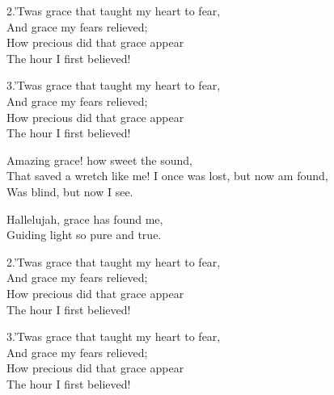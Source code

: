 \documentclass[12pt]{article}
\begin{document}
\begin{stanza}
2.’Twas grace that taught my heart to fear,\\
And grace my fears relieved;\\
How precious did that grace appear\\
The hour I first believed!
\end{stanza}

\begin{stanza}
3.’Twas grace that taught my heart to fear,\\
And grace my fears relieved;\\
How precious did that grace appear\\
The hour I first believed!
\end{stanza}

\HymnBreak


\begin{stanza}
Amazing grace! how sweet the sound,\\
That saved a wretch like me!
I once was lost, but now am found,\\
Was blind, but now I see.
\end{stanza}

\begin{chorus}
Hallelujah, grace has found me,\\
Guiding light so pure and true.
\end{chorus}

\begin{stanza}
2.’Twas grace that taught my heart to fear,\\
And grace my fears relieved;\\
How precious did that grace appear\\
The hour I first believed!
\end{stanza}

\begin{stanza}
3.’Twas grace that taught my heart to fear,\\
And grace my fears relieved;\\
How precious did that grace appear\\
The hour I first believed!
\end{stanza}


\newpage
\tableofcontents
\end{document}

